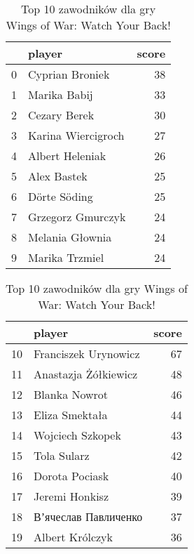 
\begin{table}[h]
\begin{minipage}{.5\linewidth}
\caption{Top 10 zawodników dla gry Indian Summer}\label{tab:top10_1}
\centering
\begin{tabular}{rlr}
\hline
    & player             &   score \\
\hline
  0 & Cyprian Broniek    &      38 \\
  1 & Marika Babij       &      33 \\
  2 & Cezary Berek       &      30 \\
  3 & Karina Wiercigroch &      27 \\
  4 & Albert Heleniak    &      26 \\
  5 & Alex Bastek        &      25 \\
  6 & Dörte Söding       &      25 \\
  7 & Grzegorz Gmurczyk  &      24 \\
  8 & Melania Głownia    &      24 \\
  9 & Marika Trzmiel     &      24 \\
\hline
\end{tabular}
\end{minipage}%
\begin{minipage}{.5\linewidth}
\centering
\caption{Top 10 zawodników dla gry Wings of War: Watch Your Back!}\label{tab:top10_2}
\begin{tabular}{rlr}
\hline
    & player               &   score \\
\hline
 10 & Franciszek Urynowicz &      67 \\
 11 & Anastazja Żółkiewicz &      48 \\
 12 & Blanka Nowrot        &      46 \\
 13 & Eliza Smektała       &      44 \\
 14 & Wojciech Szkopek     &      43 \\
 15 & Tola Sularz          &      42 \\
 16 & Dorota Pociask       &      40 \\
 17 & Jeremi Honkisz       &      39 \\
 18 & Вʼячеслав Павличенко &      37 \\
 19 & Albert Królczyk      &      36 \\
\hline
\end{tabular}
\end{minipage}%
\end{table}
